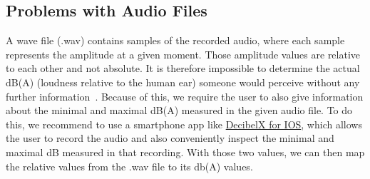 \subsection{Problems with Audio Files}\label{subsec:problems-with-audio-files}
A wave file (.wav) contains samples of the recorded audio, where each sample represents the amplitude at a given moment.
Those amplitude values are relative to each other and not absolute.
It is therefore impossible to determine the actual dB(A) (loudness relative to the human ear) someone would perceive without any further information~\cite{adobe_community_how_to_know_the_real_world_db_level_of_a_file,stackoverflow_how_can_i_calculate_audio_db_level,stackexchange_exteracting_sound_pressure_from_wav_file}.
Because of this, we require the user to also give information about the minimal and maximal dB(A) measured in the given audio file.
To do this, we recommend to use a smartphone app like \href{https://apps.apple.com/ch/app/dezibel-x-dba-l%C3%A4rm-messger%C3%A4t/id448155923}{DecibelX for IOS},
which allows the user to record the audio and also conveniently inspect the minimal and maximal dB measured in that recording.
With those two values, we can then map the relative values from the .wav file to its db(A) values.